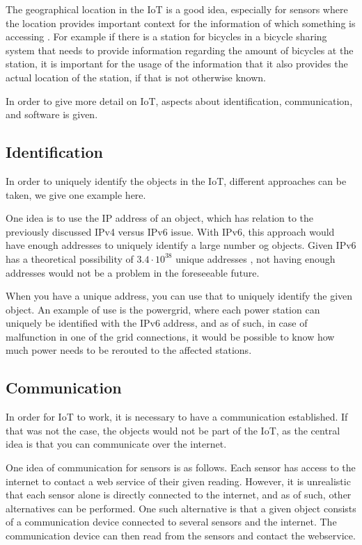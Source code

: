 The geographical location in the IoT is a good idea, especially for sensors where the location provides important context for the information of which something is accessing \citep{misc:locationMatters}.
For example if there is a station for bicycles in a bicycle sharing system that needs to provide information regarding the amount of bicycles at the station, it is important for the usage of the information that it also provides the actual location of the station, if that is not otherwise known.

In order to give more detail on IoT, aspects about identification, communication, and software is given.

\subsection{Identification}
In order to uniquely identify the objects in the IoT, different approaches can be taken, we give one example here.

One idea is to use the IP address of an object, which has relation to the previously discussed IPv4 versus IPv6 issue.
With IPv6, this approach would have enough addresses to uniquely identify a large number og objects.
Given IPv6 has a theoretical possibility of $3.4 \cdot 10^{38}$ unique addresses \citep{misc:ipv6}, not having enough addresses would not be a problem in the foreseeable future.

When you have a unique address, you can use that to uniquely identify the given object.
An example of use is the powergrid, where each power station can uniquely be identified with the IPv6 address, and as of such, in case of malfunction in one of the grid connections, it would be possible to know how much power needs to be rerouted to the affected stations.

\subsection{Communication}
In order for IoT to work, it is necessary to have a communication established.
If that was not the case, the objects would not be part of the IoT, as the central idea is that you can communicate over the internet.

One idea of communication for sensors is as follows.
Each sensor has access to the internet to contact a web service of their given reading.
However, it is unrealistic that each sensor alone is directly connected to the internet, and as of such, other alternatives can be performed.
One such alternative is that a given object consists of a communication device connected to several sensors and the internet.
The communication device can then read from the sensors and contact the webservice.

